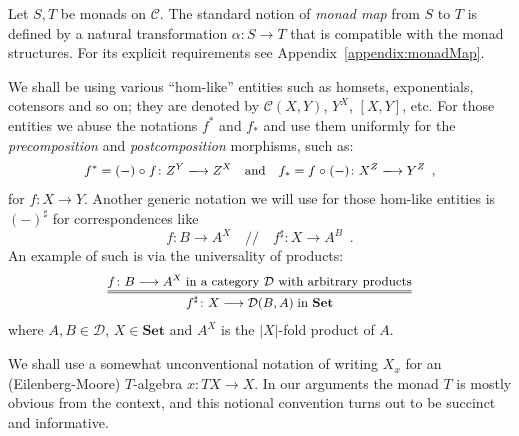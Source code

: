 \documentclass[9pt, preprint]{sigplanconf}
\theoremstyle{theorem}
\theoremstyle{definition}
\newcommand{\cat}[1]{\mathcal{#1}}
\newcommand{\place}{{-}}
\newcommand{\Set}{\mathbf{Set}}
\newcommand{\Sets}{\Set}
\newcommand{\after}{\mathrel{\circ}}
\newcommand{\longto}{\longrightarrow}
\begin{document}
Let $S,T$ be monads on $\cat{C}$. The standard notion of
 \emph{monad map} from $S$ to $T$ is defined by
a natural transformation $\alpha\colon S\to T$ that is compatible with
the monad structures. For its explicit requirements see
Appendix~\ref{appendix:monadMap}.




We shall be using various ``hom-like'' entities such as
homsets, exponentials, cotensors and so on; they are denoted by
$\cat{C}(X, Y)$, $Y^X$, $[X, Y]$, etc. For those entities we abuse
the notations $f^*$ and $f_*$ and use them uniformly for the
\emph{precomposition} and \emph{postcomposition} morphisms, such as:
\begin{align*}
\small\begin{array}{l}
 f^{*} = (-) \after f \colon Z^Y \longrightarrow Z^X
 \quad\text{and}\quad
 f_{*} = f \after (-) \colon X^{Z}\longrightarrow Y^{Z}\enspace,
\end{array}
\end{align*}
for $f\colon X\to Y$.
Another generic notation  we will use for those hom-like entities is
 $(\place)^{\sharp}$ for  correspondences like
\begin{displaymath}
  f\colon B\to A^{X}\quad\bigl/\!\!\bigr/\quad
  f^{\sharp} \colon X\to A^{B}\enspace.
\end{displaymath}
An example of such is via the universality of products:
\begin{displaymath}
\small\begin{array}{l}
\infer={  f^{\sharp} \colon X\longto \cat{D}(B,A)\;\text{in $\Sets$}}{  f\colon B\longto A^{X}\;\text{in a category $\cat{D}$ with arbitrary
 products}
}
\end{array}
\end{displaymath}
 where $A,B\in\cat{D}$, $X\in \Sets$ and $A^{X}$ is the $|X|$-fold
 product of $A$.




We shall use a somewhat unconventional notation of writing $X_{x}$ for an
(Eilenberg-Moore) $T$-algebra $x\colon TX\to X$. In our arguments the
monad $T$ is mostly obvious from the context, and this notional
convention turns out to be succinct and informative.
\end{document}
